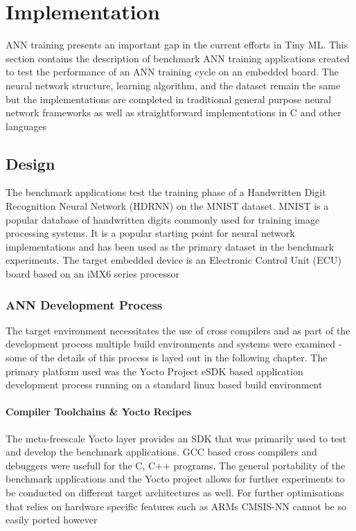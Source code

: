 \part{Implementation}

ANN training presents an important gap in the current efforts in Tiny ML. This section contains the description of benchmark ANN training applications created to test the performance of an ANN training cycle on an embedded board. The neural network structure, learning algorithm, and the dataset remain the same but the implementations are completed in traditional general purpose neural network frameworks as well as straightforward implementations in C and other languages

\chapter{Design}

The benchmark applications test the training phase of a Handwritten Digit Recognition Neural Network (HDRNN) on the MNIST dataset. MNIST is a popular database of handwritten digits commonly used for training image processing systems. It is a popular starting point for neural network implementations and has been used as the primary dataset in the benchmark experiments. The target embedded device is an Electronic Control Unit (ECU) board based on an iMX6 series processor

\section[Artificial Neural Network Development Process]{ANN Development Process}

The target environment necessitates the use of cross compilers and as part of the development process multiple build environments and systems were examined - some of the details of this process is layed out in the following chapter. The primary platform used was the Yocto Project eSDK based application development process running on a standard linux based build environment

\subsection[Cross compilers \& Build System]{Compiler Toolchains \& Yocto Recipes}

The meta-freescale Yocto layer provides an SDK that was primarily used to test and develop the benchmark applications. GCC based cross compilers and debuggers were usefull for the C, C++ programs. The general portability of the benchmark applications and the Yocto project allows for further experiments to be conducted on different target architectures as well. For further optimisations that relies on hardware specific features such as ARM\textquotesingle s CMSIS-NN cannot be so easily ported however

